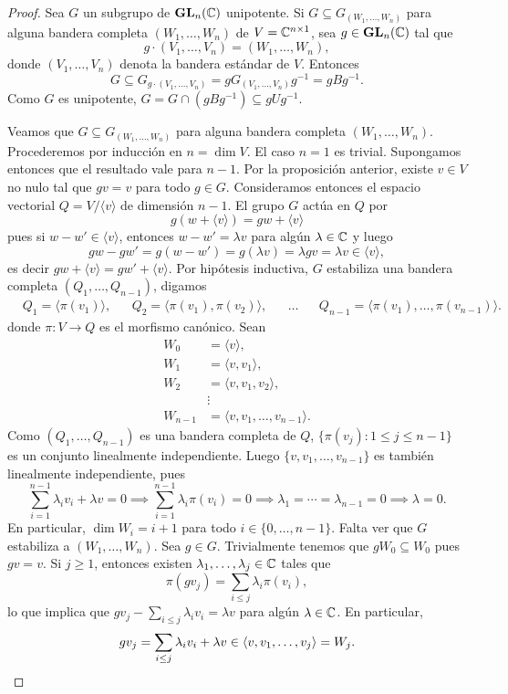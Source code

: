 \begin{proof}
	Sea $G$ un subgrupo de $\mathbf{GL}_n(\mathbb{C})$ unipotente. Si $G\subseteq G_{(W_1,\dots,W_n)}$ para alguna
	bandera completa $(W_1,\dots,W_n)$ de $V=\mathbb{C}^{n\times 1}$, sea $g\in\mathbf{GL}_n(\mathbb{C})$ tal que
	\[
	g\cdot (V_1,\dots,V_n)=(W_1,\dots,W_n),
	\]
	donde $(V_1,\dots,V_n)$ denota la bandera estándar de $V$. 
	Entonces  
	\[
	G\subseteq G_{g\cdot (V_1,\dots,V_n)}=gG_{(V_1,\dots,V_n)}g^{-1}=gBg^{-1}.
	\]
	Como $G$ es unipotente, $G=G\cap (gBg^{-1})\subseteq gUg^{-1}$. 

	Veamos que $G\subseteq G_{(W_1,\dots,W_n)}$ para alguna bandera completa $(W_1,\dots,W_n)$. 
	Procederemos por inducción en $n=\dim V$. El caso $n=1$ es trivial. Supongamos entonces
	que el resultado vale para $n-1$. 
	Por la proposición anterior, existe $v\in V$ no nulo 
	tal que $gv=v$ para todo $g\in G$. Consideramos entonces el espacio vectorial 
	$Q=V/\langle v\rangle$ de dimensión $n-1$. El grupo $G$ actúa en $Q$ 
	por 
	\[
	g(w+\langle v\rangle)=gw+\langle v\rangle
	\]
	pues si $w-w'\in\langle v\rangle$, entonces
	$w-w'=\lambda v$ para algún $\lambda\in\mathbb{C}$ y luego
	\[
	gw-gw'=g(w-w')=g(\lambda v)=\lambda gv=\lambda v\in\langle v\rangle,
	\]
	es decir $gw+\langle v\rangle=gw'+\langle v\rangle$. 
	Por hipótesis inductiva, 
	$G$ estabiliza una bandera completa $(Q_1,\dots,Q_{n-1})$, digamos
	\begin{align*}
	&Q_1 =\langle \pi(v_1)\rangle,&&
	Q_2=\langle\pi(v_1),\pi(v_2)\rangle,&&
	\dots&&
	Q_{n-1}=\langle\pi(v_1),\dots,\pi(v_{n-1})\rangle.
	\end{align*}
	donde $\pi\colon V\to Q$ es el morfismo canónico. 
	Sean 
	\begin{align*}
	W_0&=\langle v\rangle,\\
	W_1&=\langle v,v_1\rangle,\\
	W_2&=\langle v,v_1,v_2\rangle,\\
	&\vdots\\
	W_{n-1}&=\langle v,v_1,\dots,v_{n-1}\rangle.
	\end{align*}	
	Como $(Q_1,\dots,Q_{n-1})$ es una bandera completa de $Q$,  
	$\{\pi(v_j):1\leq j\leq n-1\}$ es un conjunto linealmente independiente. Luego  
	$\{v,v_1,\dots,v_{n-1}\}$ es también linealmente independiente, pues
	\[
	\sum_{i=1}^{n-1}\lambda_i v_i+\lambda v=0\implies
	\sum_{i=1}^{n-1}\lambda _i\pi(v_i)=0
	\implies\lambda_1=\cdots=\lambda_{n-1}=0\implies \lambda=0.
	\]	
	En particular, $\dim W_i=i+1$ para todo $i\in\{0,\dots,n-1\}$. Falta ver que $G$ estabiliza a 
	$(W_1,\dots,W_n)$. Sea $g\in G$. Trivialmente tenemos que 
	$gW_0\subseteq W_0$ pues $gv=v$. Si $j\geq 1$, entonces existen $\lambda_1,\dots,\lambda_j\in\mathbb{C}$ tales que 
	\[
	\pi(gv_j)=\sum_{i\leq j}\lambda_i\pi(v_i),
	\]
	lo que implica que $gv_j-\sum_{i\leq j}\lambda_iv_i=\lambda v$ para algún $\lambda\in\mathbb{C}$. En particular, 
	\[
	gv_j=\sum_{i\leq j}\lambda_iv_i+\lambda v\in \langle v,v_1,\dots,v_j\rangle=W_j.	\qedhere
	\]
\end{proof}

